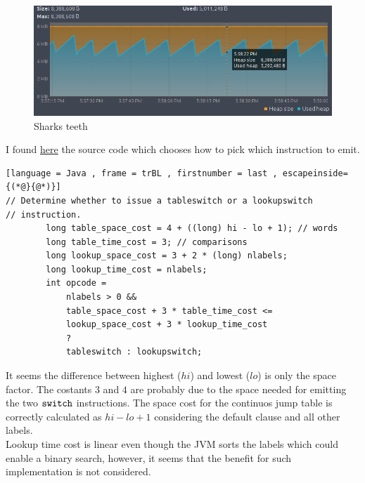 \documentclass[11pt]{article}
\begin{document}
\begin{question}
\begin{figure}[h]
\centering
    \includegraphics[width=1\textwidth]{images/Shark.png}
    \caption{Sharks teeth}
\end{figure}

\end{question}

\newpage

\begin{question}



I found \href{https://github.com/openjdk/jdk/blob/082125d61e4b7e0fd53528c0271ca8be621f242b/src/jdk.compiler/share/classes/com/sun/tools/javac/jvm/Gen.java#L1350}{here} the source code which chooses how to pick which instruction to emit.

\begin{lstlisting}[language = Java , frame = trBL , firstnumber = last , escapeinside={(*@}{@*)}]
// Determine whether to issue a tableswitch or a lookupswitch 
// instruction.
        long table_space_cost = 4 + ((long) hi - lo + 1); // words
        long table_time_cost = 3; // comparisons
        long lookup_space_cost = 3 + 2 * (long) nlabels;
        long lookup_time_cost = nlabels;
        int opcode =
            nlabels > 0 &&
            table_space_cost + 3 * table_time_cost <=
            lookup_space_cost + 3 * lookup_time_cost
            ?
            tableswitch : lookupswitch;

\end{lstlisting}

It seems the difference between highest ($hi$) and lowest ($lo$) is only the space factor. The costants $3$ and $4$ are probably due to the space needed for emitting the two $\verb|switch|$ instructions. 
The space cost for the continuos jump table is correctly calculated as $hi-lo + 1$ considering the default clause and all other labels.\\
Lookup time cost is linear even though the JVM sorts the labels which could enable a binary search, however, it seems that the benefit for such implementation is not considered.
\end{question}
\end{document}
